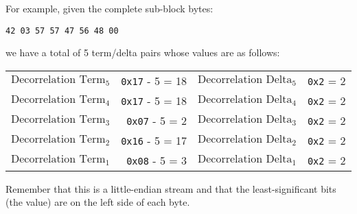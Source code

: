 For example, given the complete sub-block bytes:
\begin{Verbatim}[frame=single]
42 03 57 57 47 56 48 00
\end{Verbatim}
we have a total of 5 term/delta pairs whose values are as follows:
\begin{table}[h]
\begin{tabular}{r r | r r}
$\text{Decorrelation Term}_5$ & \texttt{0x17} - 5 = 18 & $\text{Decorrelation Delta}_5$ & \texttt{0x2} = 2 \\
$\text{Decorrelation Term}_4$ & \texttt{0x17} - 5 = 18 & $\text{Decorrelation Delta}_4$ & \texttt{0x2} = 2 \\
$\text{Decorrelation Term}_3$ & \texttt{0x07} - 5 = 2 & $\text{Decorrelation Delta}_3$ & \texttt{0x2} = 2 \\
$\text{Decorrelation Term}_2$ & \texttt{0x16} - 5 = 17 & $\text{Decorrelation Delta}_2$ & \texttt{0x2} = 2 \\
$\text{Decorrelation Term}_1$ & \texttt{0x08} - 5 = 3 & $\text{Decorrelation Delta}_1$ & \texttt{0x2} = 2 \\
\end{tabular}
\end{table}
\par
\noindent
Remember that this is a little-endian stream and that the least-significant
bits (the  value) are on the left side of each byte.

\clearpage

